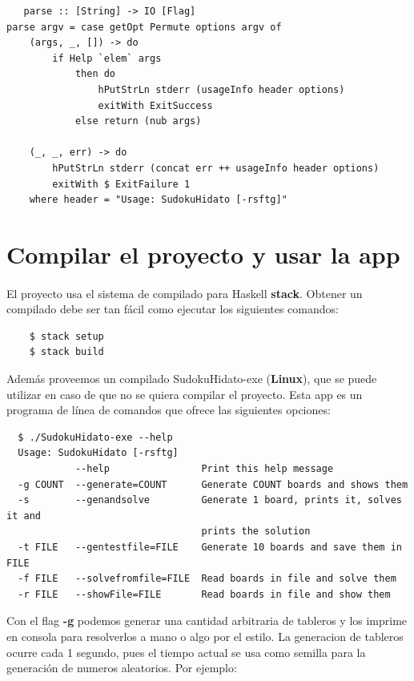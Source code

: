 \documentclass[a4paper, 12pt]{article}
\begin{document}
\begin{verbatim}
   parse :: [String] -> IO [Flag]
parse argv = case getOpt Permute options argv of
    (args, _, []) -> do
        if Help `elem` args
            then do
                hPutStrLn stderr (usageInfo header options)
                exitWith ExitSuccess
            else return (nub args)

    (_, _, err) -> do
        hPutStrLn stderr (concat err ++ usageInfo header options)
        exitWith $ ExitFailure 1
    where header = "Usage: SudokuHidato [-rsftg]"
\end{verbatim}

\section*{Compilar el proyecto y usar la app}
\paragraph{}
El proyecto usa el sistema de compilado para Haskell \textbf{stack}. Obtener un compilado debe ser tan f\'acil como ejecutar los siguientes
comandos:

\begin{verbatim}
    $ stack setup
    $ stack build
\end{verbatim}

Adem\'as proveemos un compilado SudokuHidato-exe (\textbf{Linux}), que se puede utilizar en caso de que no se quiera compilar el proyecto.
Esta app es un programa de l\'inea de comandos que ofrece las siguientes opciones:

\begin{verbatim}
  $ ./SudokuHidato-exe --help
  Usage: SudokuHidato [-rsftg]
            --help                Print this help message
  -g COUNT  --generate=COUNT      Generate COUNT boards and shows them
  -s        --genandsolve         Generate 1 board, prints it, solves it and 
                                  prints the solution
  -t FILE   --gentestfile=FILE    Generate 10 boards and save them in FILE
  -f FILE   --solvefromfile=FILE  Read boards in file and solve them
  -r FILE   --showFile=FILE       Read boards in file and show them
\end{verbatim}

Con el flag \textbf{-g} podemos generar una cantidad arbitraria de tableros y los imprime en consola
para resolverlos a mano o algo por el estilo. La generacion de tableros ocurre cada 1 segundo, pues
el tiempo actual se usa como semilla para la generaci\'on de numeros aleatorios. Por ejemplo:
\end{document}
